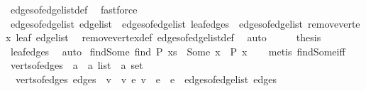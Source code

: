 \begin{isabellebody}
\ edges{\isacharunderscore}{\kern0pt}of{\isacharunderscore}{\kern0pt}edge{\isacharunderscore}{\kern0pt}list{\isacharunderscore}{\kern0pt}def\ \isamarkupfalse%
\ fastforce\isanewline
\isanewline
\ \ \isamarkupfalse%
\ {\isachardoublequoteopen}edges{\isacharunderscore}{\kern0pt}of{\isacharunderscore}{\kern0pt}edge{\isacharunderscore}{\kern0pt}list\ edge{\isacharunderscore}{\kern0pt}list\ {\isacharequal}{\kern0pt}\ edges{\isacharunderscore}{\kern0pt}of{\isacharunderscore}{\kern0pt}edge{\isacharunderscore}{\kern0pt}list\ {\isacharquery}{\kern0pt}leaf{\isacharunderscore}{\kern0pt}edges\ {\isasymunion}\ edges{\isacharunderscore}{\kern0pt}of{\isacharunderscore}{\kern0pt}edge{\isacharunderscore}{\kern0pt}list\ {\isacharparenleft}{\kern0pt}remove{\isacharunderscore}{\kern0pt}vertex\ leaf\ edge{\isacharunderscore}{\kern0pt}list{\isacharparenright}{\kern0pt}{\isachardoublequoteclose}\ \isamarkupfalse%
\ remove{\isacharunderscore}{\kern0pt}vertex{\isacharunderscore}{\kern0pt}def\ edges{\isacharunderscore}{\kern0pt}of{\isacharunderscore}{\kern0pt}edge{\isacharunderscore}{\kern0pt}list{\isacharunderscore}{\kern0pt}def\ \isamarkupfalse%
\ auto\isanewline
\ \ \isamarkupfalse%
\ \isamarkupfalse%
\ {\isacharquery}{\kern0pt}thesis\ \isamarkupfalse%
\ leaf{\isacharunderscore}{\kern0pt}edges\ \isamarkupfalse%
\ auto\isanewline
{}\isamarkupfalse%
%
\endisatagproof
{\isafoldproof}%
%
\isadelimproof
\isanewline
%
\endisadelimproof
\isanewline
{}\isamarkupfalse%
\ find{\isacharunderscore}{\kern0pt}Some{\isacharcolon}{\kern0pt}\ {\isachardoublequoteopen}find\ P\ xs\ {\isacharequal}{\kern0pt}\ Some\ x\ {\isasymLongrightarrow}\ P\ x{\isachardoublequoteclose}\isanewline
%
\isadelimproof
\ \ %
\endisadelimproof
%
\isatagproof
{}\isamarkupfalse%
\ {\isacharparenleft}{\kern0pt}metis\ find{\isacharunderscore}{\kern0pt}Some{\isacharunderscore}{\kern0pt}iff{\isacharparenright}{\kern0pt}%
\endisatagproof
{\isafoldproof}%
%
\isadelimproof
\isanewline
%
\endisadelimproof
\isanewline
{}\isamarkupfalse%
\ verts{\isacharunderscore}{\kern0pt}of{\isacharunderscore}{\kern0pt}edges\ {\isacharcolon}{\kern0pt}{\isacharcolon}{\kern0pt}\ {\isachardoublequoteopen}{\isacharparenleft}{\kern0pt}{\isacharprime}{\kern0pt}a\ {\isasymtimes}\ {\isacharprime}{\kern0pt}a{\isacharparenright}{\kern0pt}\ list\ {\isasymRightarrow}\ {\isacharprime}{\kern0pt}a\ set{\isachardoublequoteclose}\ \isanewline
\ \ {\isachardoublequoteopen}verts{\isacharunderscore}{\kern0pt}of{\isacharunderscore}{\kern0pt}edges\ edges\ {\isacharequal}{\kern0pt}\ {\isacharbraceleft}{\kern0pt}v\ {\isacharbar}{\kern0pt}\ v\ e{\isachardot}{\kern0pt}\ v\ {\isasymin}\ e\ {\isasymand}\ e\ {\isasymin}\ edges{\isacharunderscore}{\kern0pt}of{\isacharunderscore}{\kern0pt}edge{\isacharunderscore}{\kern0pt}list\ edges{\isacharbraceright}{\kern0pt}{\isachardoublequoteclose}\isanewline

\end{isabellebody}
